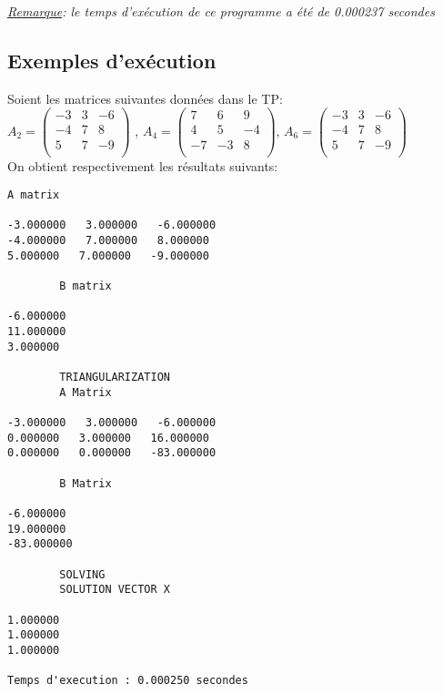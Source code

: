 \textit{\underline{Remarque}: le temps d'exécution de ce programme a été de 0.000237 secondes}
\subsection{Exemples d'exécution}

Soient les matrices suivantes données dans le TP:\\

$A_2 = \begin{pmatrix}
-3 & 3 & -6 \\
-4 & 7 &  8 \\
5 & 7 & -9 \\
\end{pmatrix}
$
,
$A_4 = \begin{pmatrix}
7 & 6 & 9 \\
4 & 5 &  -4\\
-7 & -3 & 8 \\
\end{pmatrix}
$,
$A_6 = \begin{pmatrix}
-3 & 3 & -6 \\
-4 & 7 &  8 \\
5 & 7 & -9 \\
\end{pmatrix}
$
\vspace{12pt}\\
On obtient respectivement les résultats suivants:
\\
\begin{lstlisting}[caption={$A_2X=B$} results, basicstyle=\fontsize{8}{10}\selectfont]
  		A matrix 

-3.000000   3.000000   -6.000000   
-4.000000   7.000000   8.000000   
5.000000   7.000000   -9.000000   

		B matrix 

-6.000000   
11.000000   
3.000000   

		TRIANGULARIZATION
		A Matrix 

-3.000000   3.000000   -6.000000   
0.000000   3.000000   16.000000   
0.000000   0.000000   -83.000000   

		B Matrix 

-6.000000   
19.000000   
-83.000000   

		SOLVING 
		SOLUTION VECTOR X 

1.000000   
1.000000   
1.000000   

Temps d'execution : 0.000250 secondes
\end{lstlisting}
